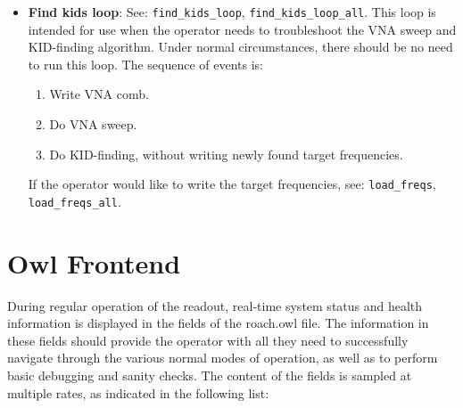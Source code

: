 \begin{itemize}[leftmargin=*,label={}]
\item \textbf{Find kids loop}: See: \texttt{find\_kids\_loop}, \texttt{find\_kids\_loop\_all}. This loop is intended for use when the operator needs to troubleshoot the VNA sweep and KID-finding algorithm. Under normal circumstances, there should be no need to run this loop. The sequence of events is:
\begin{enumerate}
  \item Write VNA comb.
  \item Do VNA sweep.
  \item Do KID-finding, without writing newly found target frequencies.
\end{enumerate}

If the operator would like to write the target frequencies, see: \texttt{load\_freqs}, \texttt{load\_freqs\_all}.

\end{itemize}

\section{Owl Frontend}\label{owl}
During regular operation of the readout, real-time system status and health information is displayed in the fields of the roach.owl file. The information in these fields should provide the operator with all they need to successfully navigate through the various normal modes of operation, as well as to perform basic debugging and sanity checks. The content of the fields is sampled at multiple rates, as indicated in the following list:

